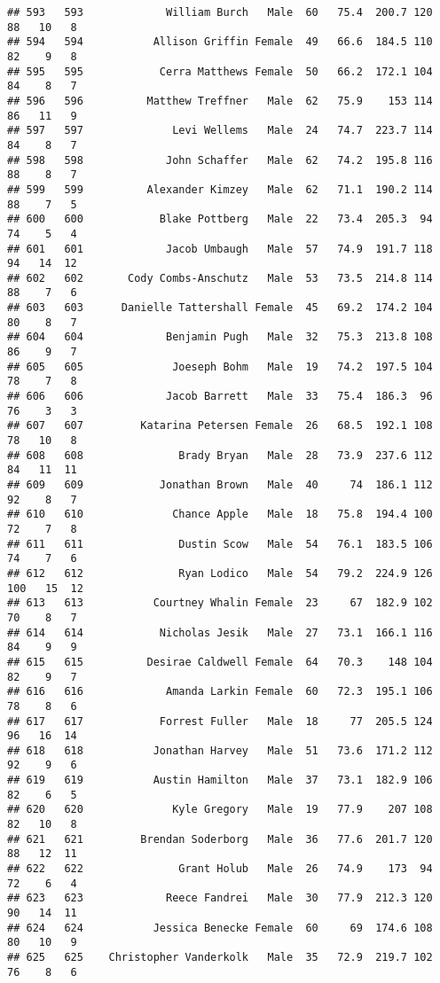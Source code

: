 \documentclass[
]{article}
\begin{document}
\begin{verbatim}
## 593   593             William Burch   Male  60   75.4  200.7 120  88   10   8
## 594   594           Allison Griffin Female  49   66.6  184.5 110  82    9   8
## 595   595            Cerra Matthews Female  50   66.2  172.1 104  84    8   7
## 596   596          Matthew Treffner   Male  62   75.9    153 114  86   11   9
## 597   597              Levi Wellems   Male  24   74.7  223.7 114  84    8   7
## 598   598             John Schaffer   Male  62   74.2  195.8 116  88    8   7
## 599   599          Alexander Kimzey   Male  62   71.1  190.2 114  88    7   5
## 600   600            Blake Pottberg   Male  22   73.4  205.3  94  74    5   4
## 601   601             Jacob Umbaugh   Male  57   74.9  191.7 118  94   14  12
## 602   602       Cody Combs-Anschutz   Male  53   73.5  214.8 114  88    7   6
## 603   603      Danielle Tattershall Female  45   69.2  174.2 104  80    8   7
## 604   604             Benjamin Pugh   Male  32   75.3  213.8 108  86    9   7
## 605   605              Joeseph Bohm   Male  19   74.2  197.5 104  78    7   8
## 606   606             Jacob Barrett   Male  33   75.4  186.3  96  76    3   3
## 607   607         Katarina Petersen Female  26   68.5  192.1 108  78   10   8
## 608   608               Brady Bryan   Male  28   73.9  237.6 112  84   11  11
## 609   609            Jonathan Brown   Male  40     74  186.1 112  92    8   7
## 610   610              Chance Apple   Male  18   75.8  194.4 100  72    7   8
## 611   611               Dustin Scow   Male  54   76.1  183.5 106  74    7   6
## 612   612               Ryan Lodico   Male  54   79.2  224.9 126 100   15  12
## 613   613           Courtney Whalin Female  23     67  182.9 102  70    8   7
## 614   614            Nicholas Jesik   Male  27   73.1  166.1 116  84    9   9
## 615   615          Desirae Caldwell Female  64   70.3    148 104  82    9   7
## 616   616             Amanda Larkin Female  60   72.3  195.1 106  78    8   6
## 617   617            Forrest Fuller   Male  18     77  205.5 124  96   16  14
## 618   618           Jonathan Harvey   Male  51   73.6  171.2 112  92    9   6
## 619   619           Austin Hamilton   Male  37   73.1  182.9 106  82    6   5
## 620   620              Kyle Gregory   Male  19   77.9    207 108  82   10   8
## 621   621         Brendan Soderborg   Male  36   77.6  201.7 120  88   12  11
## 622   622               Grant Holub   Male  26   74.9    173  94  72    6   4
## 623   623             Reece Fandrei   Male  30   77.9  212.3 120  90   14  11
## 624   624           Jessica Benecke Female  60     69  174.6 108  80   10   9
## 625   625    Christopher Vanderkolk   Male  35   72.9  219.7 102  76    8   6

\end{verbatim}
\end{document}
